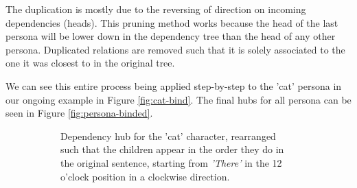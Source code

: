 The duplication is mostly due to the reversing of direction on incoming dependencies (heads). This pruning method works because the head of the last persona will be lower down in the dependency tree than the head of any other persona. Duplicated relations are removed such that it is solely associated to the one it was closest to in the original tree.

We can see this entire process being applied step-by-step to the 'cat' persona in our ongoing example in Figure \ref{fig:cat-bind}. The final hubs for all persona can be seen in Figure \ref{fig:persona-binded}.

\begin{figure}[h!]
\centering
\begin{subfigure}[t]{0.45\textwidth}
	\centering
    \caption{Dependency hub for the 'cat' character, rearranged such that the children appear in the order they do in the original sentence, starting from \textit{'There'} in the 12 o'clock position in a clockwise direction.}
\end{subfigure}
~
\begin{subfigure}[t]{0.45\textwidth}
	\centering
\end{subfigure}
\end{figure}
